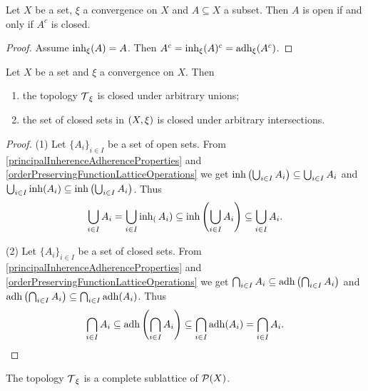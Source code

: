 \begin{lemma}
Let $X$ be a set, $\xi$ a convergence on $X$ and $A\subseteq X$ a subset. Then $A$ is open \textup{if and only if} $A^c$ is closed.
\end{lemma}
\begin{proof}
Assume $\operatorname{inh}_\xi(A) = A$. Then $A^c = \operatorname{inh}_\xi(A)^c = \operatorname{adh}_\xi(A^c)$.
\end{proof}

\begin{lemma} \label{completeClosureTopology}
Let $X$ be a set and $\xi$ a convergence on $X$. Then
\begin{enumerate}
\item the topology $\operatorname{\mathcal{T}}_\xi$ is closed under arbitrary unions;
\item the set of closed sets in $\left( X,\xi \right)$ is closed under arbitrary intersections.
\end{enumerate}
\end{lemma}
\begin{proof}
(1) Let $\{A_i\}_{i\in I}$ be a set of open sets. From \ref{principalInherenceAdherenceProperties} and \ref{orderPreservingFunctionLatticeOperations} we get $\operatorname{inh}\left(\bigcup_{i\in I}A_i\right) \subseteq \bigcup_{i\in I}A_i$ and $\bigcup_{i\in I}\operatorname{inh}(A_i) \subseteq \operatorname{inh}\left(\bigcup_{i\in I} A_i\right)$. Thus
\[ \bigcup_{i\in I}A_i  = \bigcup_{i\in I}\operatorname{inh}_(A_i) \subseteq \operatorname{inh}\left(\bigcup_{i\in I} A_i\right) \subseteq \bigcup_{i\in I}A_i. \]

(2) Let $\{A_i\}_{i\in I}$ be a set of closed sets. From \ref{principalInherenceAdherenceProperties} and \ref{orderPreservingFunctionLatticeOperations} we get $\bigcap_{i\in I}A_i \subseteq \operatorname{adh}\left(\bigcap_{i\in I}A_i\right)$ and $\operatorname{adh}\left(\bigcap_{i\in I} A_i\right)\subseteq \bigcap_{i\in I}\operatorname{adh}(A_i)$. Thus
\[ \bigcap_{i\in I}A_i \subseteq \operatorname{adh}\left(\bigcap_{i\in I}A_i\right) \subseteq \bigcap_{i\in I}\operatorname{adh}(A_i) = \bigcap_{i\in I}A_i. \]
\end{proof}
\begin{corollary}
The topology $\operatorname{\mathcal{T}}_\xi$ is a complete sublattice of $\operatorname{\mathcal{P}}(X)$.
\end{corollary}

